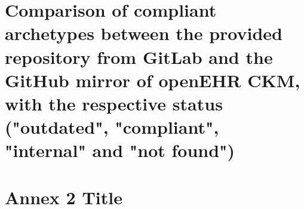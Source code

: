 \documentclass[mim_thesis.tex]{subfiles}
\begin{document}
\section{Comparison of compliant archetypes between the provided repository from GitLab and the GitHub mirror of openEHR CKM, with the respective status ("outdated", "compliant", "internal" and "not found")}




\section{Annex 2 Title}

\end{document}

